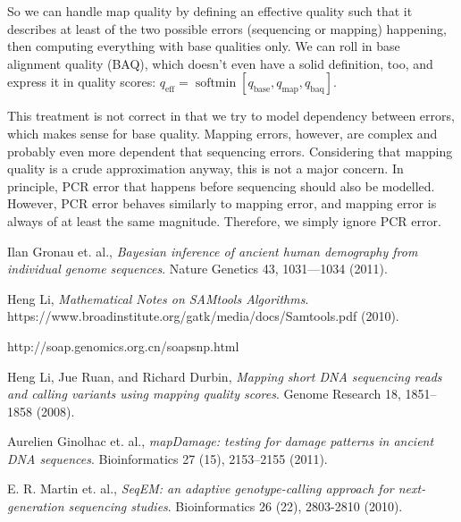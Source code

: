 \documentclass{article}
\begin{document}
So we can handle map quality by defining an effective quality such that it describes at least of the two possible errors (sequencing
or mapping) happening, then computing everything with base qualities only.  We can roll in base alignment quality (BAQ), which
doesn't even have a solid definition, too, and express it in quality scores: $q_{\operatorname{eff}} = \operatorname{softmin} \left[
q_{\operatorname{base}}, q_{\operatorname{map}}, q_{\operatorname{baq}} \right]$. 

This treatment is not correct in that we try to model dependency between errors, which makes sense for base quality.  Mapping
errors, however, are complex and probably even more dependent that sequencing errors.  Considering that mapping quality is a crude
approximation anyway, this is not a major concern.  In principle, PCR
error that happens before sequencing should also be modelled.  However,
PCR error behaves similarly to mapping error, and mapping error is
always of at least the same magnitude.  Therefore, we simply ignore PCR
error.

\listoftodos

\begin{thebibliography}{9}

  Ilan Gronau et. al.,
  \emph{Bayesian inference of ancient human demography from individual genome sequences}.
  Nature Genetics 43, 1031---1034 (2011).

  Heng Li,
  \emph{Mathematical Notes on SAMtools Algorithms}.
  https://www.broadinstitute.org/gatk/media/docs/Samtools.pdf (2010).

  http://soap.genomics.org.cn/soapsnp.html

  Heng Li, Jue Ruan, and Richard Durbin,
  \emph{Mapping short DNA sequencing reads and calling variants using mapping quality scores}.
  Genome Research 18, 1851--1858 (2008). 

  Aurelien Ginolhac et. al.,
  \emph{mapDamage: testing for damage patterns in ancient DNA sequences}.
  Bioinformatics 27 (15), 2153--2155 (2011).

  E. R. Martin et. al.,
  \emph{SeqEM: an adaptive genotype-calling approach for next-generation
  sequencing studies}.
  Bioinformatics 26 (22), 2803-2810 (2010).
\end{thebibliography}
\end{document}
